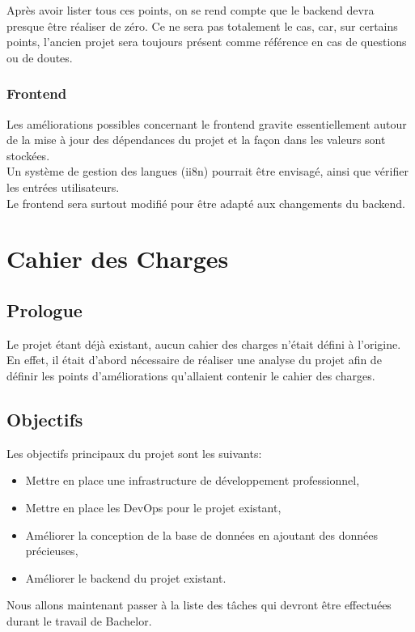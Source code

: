 \documentclass[
    iai, %
    il, %
]{heig-tb}
\begin{document}
Après avoir lister tous ces points, on se rend compte que le backend devra presque être réaliser de
zéro. Ce ne sera pas totalement le cas, car, sur certains points, l'ancien projet sera toujours
présent comme référence en cas de questions ou de doutes.

\subsubsection{Frontend}
Les améliorations possibles concernant le frontend gravite essentiellement autour de la mise à jour des dépendances du projet et la façon dans les valeurs sont stockées.\\
Un système de gestion des langues (ii8n) pourrait être envisagé, ainsi que vérifier les entrées utilisateurs.\\
Le frontend sera surtout modifié pour être adapté aux changements du backend.

\section{Cahier des Charges}

\subsection{Prologue}

Le projet étant déjà existant, aucun cahier des charges n'était défini à l'origine. En effet, il était d'abord nécessaire de réaliser une analyse du projet afin de définir les points d'améliorations qu'allaient contenir le cahier des charges.

\subsection{Objectifs \label{objectifs}}

Les objectifs principaux du projet sont les suivants:
\begin{itemize}
    \item Mettre en place une infrastructure de développement professionnel,
    \item Mettre en place les DevOps pour le projet existant,
    \item Améliorer la conception de la base de données en ajoutant des données précieuses,
    \item Améliorer le backend du projet existant.
\end{itemize}

\newpage
Nous allons maintenant passer à la liste des tâches qui devront être effectuées durant le travail de Bachelor.
\end{document}
